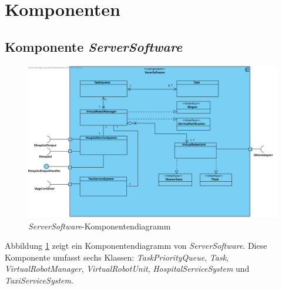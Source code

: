 \section{Komponenten}

\subsection{Komponente \textit{ServerSoftware}}
\begin{figure}[H]
\centering
\includegraphics[height=0.7\textwidth, angle=90]{img/2-Entwurf-5-ServerSoftware}
\caption{\emph{ServerSoftware}-Komponentendiagramm}
\label{KomponentenStruktur1}
\end{figure}
Abbildung \ref{KomponentenStruktur1} zeigt ein Komponentendiagramm von \emph{ServerSoftware}. 
Diese Komponente umfasst sechs Klassen: \textit{TaskPriorityQueue}, \textit{Task}, \textit{VirtualRobotManager}, \textit{VirtualRobotUnit}, \textit{HospitalServiceSystem} und \textit{TaxiServiceSystem}.

